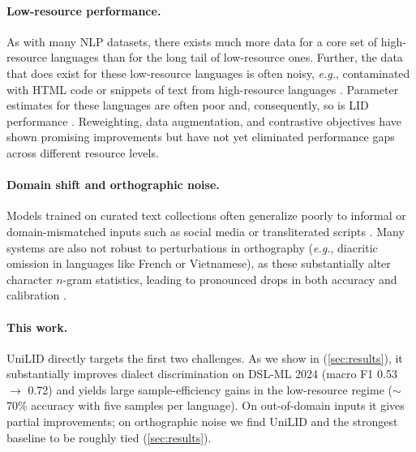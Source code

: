 \documentclass{article}
\makeatletter
\newcommand{\eg}{\emph{e.g.}\@\xspace}
\newcommand{\ngram}{$n$-gram\xspace}
\makeatother
\begin{document}
\paragraph{Low-resource performance.} 
As with many NLP datasets, there exists much more data for a core set of high-resource languages than for the long tail of low-resource ones.
Further, the data that does exist for these low-resource languages is often noisy, \eg, contaminated with HTML code or snippets of text from high-resource languages \cite{kreutzer-etal-2022-quality}.
Parameter estimates for these languages are often poor and, consequently, so is LID performance \cite{caswell-etal-2020-language,kargaran-etal-2023-glotlid}. 
Reweighting, data augmentation, and contrastive objectives have shown promising improvements but have not yet eliminated performance gaps across different resource levels.\cite{ren-etal-2022-effective,burchell-etal-2023-open,foroutan2025conlid}

\paragraph{Domain shift and orthographic noise.} 
Models trained on curated text collections often generalize poorly to informal or domain-mismatched inputs such as social media or transliterated scripts \cite{goot-2025-identifying,ojo2025diversbenchevaluatinglanguageidentification}. Many systems are also not robust to perturbations in orthography (\eg, diacritic omission in languages like French or Vietnamese), as these substantially alter character \ngram statistics, leading to pronounced drops in both accuracy and calibration \cite{caswell-etal-2020-language}.


\paragraph{This work.} UniLID directly targets the first two challenges. As we show in (\cref{sec:results}), it substantially improves dialect discrimination on DSL-ML 2024 (macro F1 0.53 $\rightarrow$ 0.72) and yields large sample-efficiency gains in the low-resource regime ($\sim$70\% accuracy with five samples per language). On out-of-domain inputs it gives partial improvements; on orthographic noise we find UniLID and the strongest baseline to be roughly tied (\cref{sec:results}).
\end{document}
